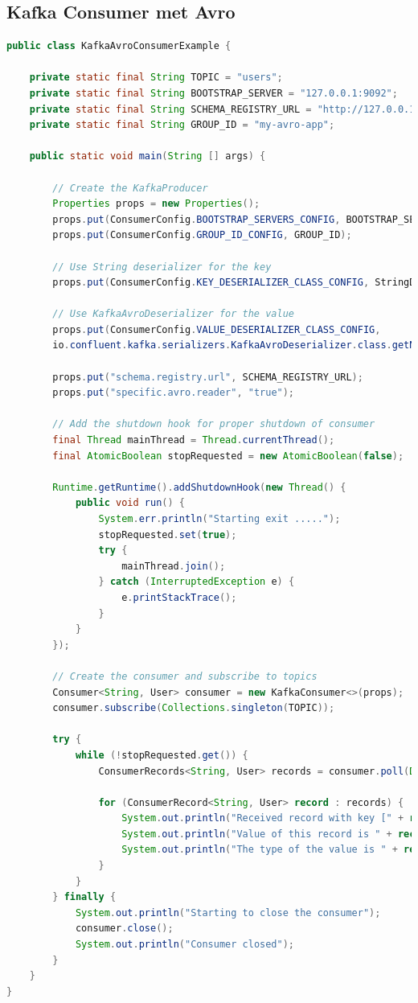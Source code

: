 \documentclass[a4paper,10pt,twoside]{report}
\begin{document}
\newpage

\subsection{Kafka Consumer met Avro}

\begin{lstlisting}[language=Java]
public class KafkaAvroConsumerExample {
	
	private static final String TOPIC = "users";
	private static final String BOOTSTRAP_SERVER = "127.0.0.1:9092";
	private static final String SCHEMA_REGISTRY_URL = "http://127.0.0.1:8081";
	private static final String GROUP_ID = "my-avro-app";
	
	public static void main(String [] args) {
		
		// Create the KafkaProducer
		Properties props = new Properties();
		props.put(ConsumerConfig.BOOTSTRAP_SERVERS_CONFIG, BOOTSTRAP_SERVER);
		props.put(ConsumerConfig.GROUP_ID_CONFIG, GROUP_ID);
		
		// Use String deserializer for the key
		props.put(ConsumerConfig.KEY_DESERIALIZER_CLASS_CONFIG, StringDeserializer.class.getName());
		
		// Use KafkaAvroDeserializer for the value
		props.put(ConsumerConfig.VALUE_DESERIALIZER_CLASS_CONFIG,
		io.confluent.kafka.serializers.KafkaAvroDeserializer.class.getName());
		
		props.put("schema.registry.url", SCHEMA_REGISTRY_URL);
		props.put("specific.avro.reader", "true");
		
		// Add the shutdown hook for proper shutdown of consumer
		final Thread mainThread = Thread.currentThread();
		final AtomicBoolean stopRequested = new AtomicBoolean(false);
		
		Runtime.getRuntime().addShutdownHook(new Thread() {
			public void run() {
				System.err.println("Starting exit .....");
				stopRequested.set(true);
				try {
					mainThread.join();
				} catch (InterruptedException e) {
					e.printStackTrace();
				}
			}
		});
		
		// Create the consumer and subscribe to topics
		Consumer<String, User> consumer = new KafkaConsumer<>(props);
		consumer.subscribe(Collections.singleton(TOPIC));
		
		try {
			while (!stopRequested.get()) {
				ConsumerRecords<String, User> records = consumer.poll(Duration.ofMillis(500));
				
				for (ConsumerRecord<String, User> record : records) {
					System.out.println("Received record with key [" + record.key() + "]");
					System.out.println("Value of this record is " + record.value());
					System.out.println("The type of the value is " + record.value().getClass().getName());
				}
			}
		} finally {
			System.out.println("Starting to close the consumer");
			consumer.close();
			System.out.println("Consumer closed");
		}
	}	
}
\end{lstlisting}
\end{document}
